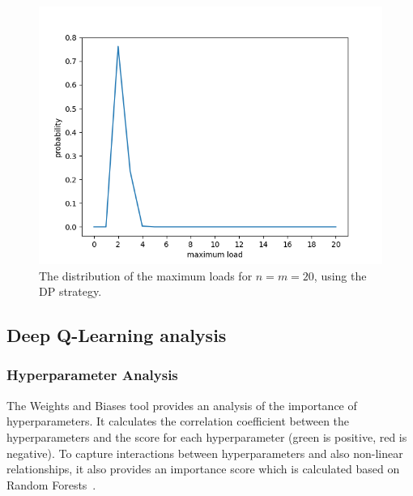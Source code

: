 \begin{figure}[hbt!] \label{two-thinning-maxload-distribution}
    \centering
    \includegraphics[scale=1.0]{Chapter4/Figs/max_load_distribution_20_20.png}
    \caption{The distribution of the maximum loads for $n=m=20$, using the DP strategy.}
\end{figure}




\subsection{Deep Q-Learning analysis}






\subsubsection{Hyperparameter Analysis}



The Weights and Biases tool provides an analysis of the importance of hyperparameters. It calculates the correlation coefficient between the hyperparameters and the score for each hyperparameter (green is positive, red is negative). To capture interactions between hyperparameters and also non-linear relationships, it also provides an importance score which is calculated based on Random Forests~\cite{biewald2020wandb}.


